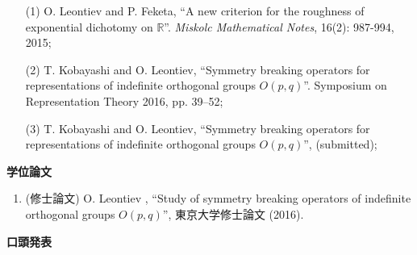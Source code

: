 \documentclass[a4j,twocolumn]{jarticle}
\begin{document}
\vspace{0.1cm}
\begin{enumerate}
	\item[(1)] O. Leontiev and P. Feketa, ``A new criterion for the roughness of exponential dichotomy on $\mathbb{R}$''. {\it
		Miskolc Mathematical Notes}, 16(2): 987-994, 2015;
	\item[(2)] T. Kobayashi and O. Leontiev, ``Symmetry breaking operators for representations of indefinite orthogonal groups $O(p,q)$''. Symposium on Representation Theory 2016, pp. 39--52;
	\item[(3)] T. Kobayashi and O. Leontiev, ``Symmetry breaking operators for representations of indefinite orthogonal groups $O(p,q)$'', (submitted);
\end{enumerate}


\noindent
{\bf 学位論文}

\vspace{0.1cm}

\begin{enumerate}
	\item (修士論文) O. Leontiev , ``Study of symmetry breaking operators of indefinite orthogonal groups $O(p,q)$'', 東京大学修士論文
		(2016).
\end{enumerate}


\vspace{0.2cm}
\noindent
{\bf 口頭発表}
\end{document}
